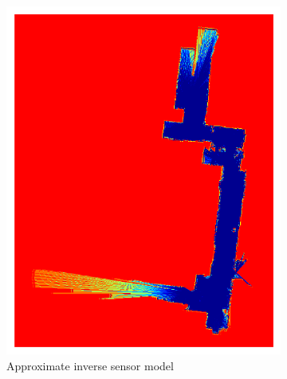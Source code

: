 \documentclass[smallextended]{svjour3}       %
\begin{document}
\begin{figure}[!ht]
    \centering
    \begin{subfigure}[t]{0.35\columnwidth}
        \centering
        \includegraphics[width=\textwidth]{AISM_Image_inf_19.pdf}
        \caption{Approximate inverse sensor model}
        \label{fig:AISM}
    \end{subfigure}
    \begin{subfigure}[t]{0.35\columnwidth}
        \centering

\end{subfigure}
\end{figure}
\end{document}
